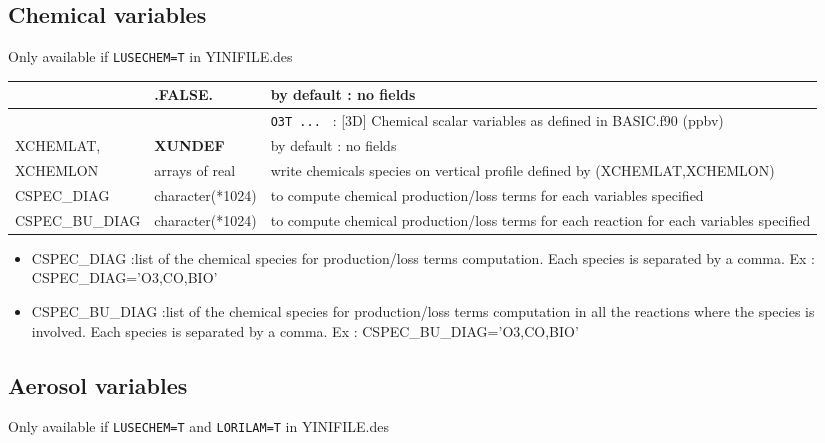 \subsection{Chemical variables}
Only available if \verb|LUSECHEM=T| in YINIFILE.des
\begin{center}
\begin{makeimage}
\begin{tabular}{|>{\centering}p{3cm}|>{\centering}p{2.5cm}|p{11cm}|}
\hline
\multirow{3}{*}{LCHEMDIAG}\index{LCHEMDIAG!\innam{NAM\_DIAG}}&\textbf{.FALSE.}&  by default : no fields\\\cline{2-3}
& \multirow{2}{*}{.TRUE.}&{\tt O3T ... } : [3D] Chemical scalar variables as defined in BASIC.f90 (ppbv)\\ \hline
XCHEMLAT,&\textbf{XUNDEF}&  by default : no fields\\\cline{2-3}
XCHEMLON&arrays of real & write chemicals species on vertical profile defined by (XCHEMLAT,XCHEMLON)\\ \hline
CSPEC\_DIAG&character(*1024) &  to compute chemical production/loss terms for each variables specified\\ \hline
CSPEC\_BU\_DIAG&character(*1024) & to compute chemical production/loss terms for each reaction for each variables specified \\ \hline
\end{tabular}
\end{makeimage} 
\end{center}
\begin{itemize}
\item CSPEC\_DIAG :list of the chemical species for production/loss terms computation. Each species is separated by a comma. Ex : CSPEC\_DIAG='O3,CO,BIO'
\item CSPEC\_BU\_DIAG  :list of the chemical species for production/loss terms computation in all the reactions where the species is involved.  Each species is separated by a comma. Ex : CSPEC\_BU\_DIAG='O3,CO,BIO'

\end{itemize}

\subsection{Aerosol variables}
Only available if \verb|LUSECHEM=T| and  \verb|LORILAM=T| in YINIFILE.des

